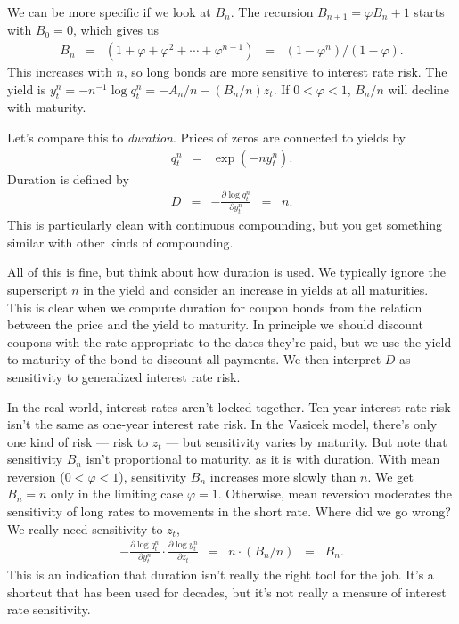 \documentclass[11pt]{article}
\begin{document}
We can be more specific if we look at $B_n$.
The recursion $B_{n+1} = \varphi B_n + 1$ starts with $B_0 = 0$,
which gives us
\begin{eqnarray*}
    B_n &=& (1 + \varphi + \varphi^2 + \cdots + \varphi^{n-1})
            \;\;=\;\; (1-\varphi^n)/(1-\varphi) .
\end{eqnarray*}
This increases with $n$, so long bonds are more sensitive to interest rate risk.
The yield is $y^n_t = -n^{-1} \log q^n_t = - A_n/n - (B_n/n) z_t$.
If $0 < \varphi < 1$,
$B_n/n$ will decline with maturity.

Let's compare this to {\it duration\/}.
Prices of zeros are connected to yields by
\begin{eqnarray*}
    q^n_t &=& \exp( - n y^n_t ).
\end{eqnarray*}
Duration is defined by
\begin{eqnarray*}
    D &=& - \frac{\partial \log q^n_t}{\partial y^n_t} \;\;=\;\; n.
\end{eqnarray*}
This is particularly clean with continuous compounding,
but you get something similar with other kinds of compounding.

All of this is fine, but think about how duration is used.
We typically ignore the superscript $n$ in the yield and consider
an increase in yields at all maturities.
This is clear when we compute duration for coupon bonds from the
relation between the price and the yield to maturity.
In principle we should discount coupons with the rate appropriate
to the dates they're paid, but we use the yield to maturity
of the bond to discount all payments.
We then interpret $D$ as sensitivity to generalized interest rate risk.

In the real world, interest rates aren't locked together.
Ten-year interest rate risk isn't the same as one-year interest rate risk.
In the Vasicek model, there's only one kind of risk --- risk to $z_t$ ---
but sensitivity varies by maturity.
But note that sensitivity $B_n$ isn't proportional to maturity,
as it is with duration.
With mean reversion ($0 < \varphi < 1$), sensitivity $B_n$ increases more slowly than $n$.
We get $B_n = n$ only in the limiting case $\varphi = 1$.
Otherwise, mean reversion moderates the sensitivity of long rates to movements in
the short rate.
Where did we go wrong?
We really need sensitivity to $z_t$,
\begin{eqnarray*}
     - \frac{\partial \log q^n_t}{\partial y^n_t}
      \cdot \frac{\partial \log y^n_t}{\partial z_t} &=& n \cdot (B_n/n) \;\;=\;\; B_n.
\end{eqnarray*}
This is an indication that duration isn't really the right tool for the job.
It's a shortcut that has been used for decades,
but it's not really a measure of interest rate sensitivity.
\end{document}

